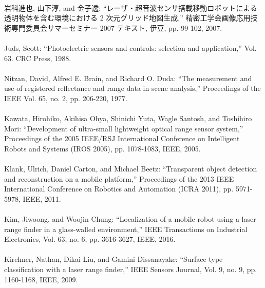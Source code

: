 \begin{mythebibliography}{}
\leavevmode \\
岩科進也, 山下淳, and 金子透:
\newblock ``レーザ・超音波センサ搭載移動ロボットによる透明物体を含む環境における 2 次元グリッド地図生成,''
\newblock 精密工学会画像応用技術専門委員会サマーセミナー 2007 テキスト, 伊豆, pp. 99-102, 2007.
\\ 

\leavevmode \\
Juds, Scott:
\newblock ``Photoelectric sensors and controls: selection and application,''
\newblock  Vol. 63. CRC Press, 1988.
\\ 

\leavevmode \\
Nitzan, David, Alfred E. Brain, and Richard O. Duda:
\newblock ``The measurement and use of registered reflectance and range data in scene analysis,''
\newblock  Proceedings of the IEEE Vol. 65, no. 2, pp. 206-220, 1977.
\\ 

\leavevmode \\
Kawata, Hirohiko, Akihisa Ohya, Shinichi Yuta, Wagle Santosh, and Toshihiro Mori:
\newblock ``Development of ultra-small lightweight optical range sensor system,''
\newblock  Proceedings of the 2005 IEEE/RSJ International Conference on Intelligent Robots and Systems (IROS 2005), pp. 1078-1083, IEEE, 2005.
\\ 

\leavevmode \\
Klank, Ulrich, Daniel Carton, and Michael Beetz:
\newblock ``Transparent object detection and reconstruction on a mobile platform,''
\newblock Proceedings of the 2013 IEEE International Conference on Robotics and Automation (ICRA 2011), pp. 5971-5978, IEEE, 2011.
\\ 

\leavevmode \\
Kim, Jiwoong, and Woojin Chung:
\newblock ``Localization of a mobile robot using a laser range finder in a glass-walled environment,''
\newblock IEEE Transactions on Industrial Electronics, Vol. 63, no. 6, pp. 3616-3627, IEEE, 2016.
\\ 
 
\leavevmode \\
Kirchner, Nathan, Dikai Liu, and Gamini Dissanayake:
\newblock ``Surface type classification with a laser range finder,''
\newblock IEEE Sensors Journal, Vol. 9, no. 9, pp. 1160-1168, IEEE, 2009.
\\ 


\end{mythebibliography}
